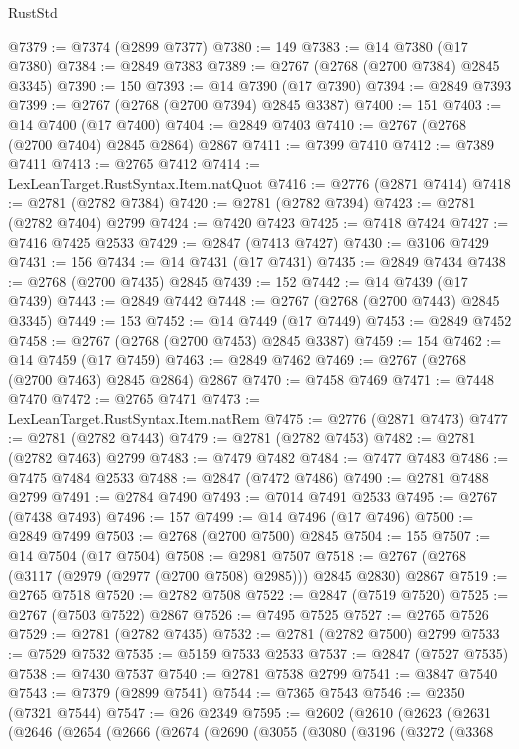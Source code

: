 \begin{lexlean}{RustStd}
\begin{coremodule}
@7379 := @7374 (@2899 @7377)
@7380 := 149
@7383 := @14 @7380 (@17 @7380)
@7384 := @2849 @7383
@7389 := @2767 (@2768 (@2700 @7384) @2845 @3345)
@7390 := 150
@7393 := @14 @7390 (@17 @7390)
@7394 := @2849 @7393
@7399 := @2767 (@2768 (@2700 @7394) @2845 @3387)
@7400 := 151
@7403 := @14 @7400 (@17 @7400)
@7404 := @2849 @7403
@7410 := @2767 (@2768 (@2700 @7404) @2845 @2864) @2867
@7411 := @7399 @7410
@7412 := @7389 @7411
@7413 := @2765 @7412
@7414 := LexLeanTarget.RustSyntax.Item.natQuot
@7416 := @2776 (@2871 @7414)
@7418 := @2781 (@2782 @7384)
@7420 := @2781 (@2782 @7394)
@7423 := @2781 (@2782 @7404) @2799
@7424 := @7420 @7423
@7425 := @7418 @7424
@7427 := @7416 @7425 @2533
@7429 := @2847 (@7413 @7427)
@7430 := @3106 @7429
@7431 := 156
@7434 := @14 @7431 (@17 @7431)
@7435 := @2849 @7434
@7438 := @2768 (@2700 @7435) @2845
@7439 := 152
@7442 := @14 @7439 (@17 @7439)
@7443 := @2849 @7442
@7448 := @2767 (@2768 (@2700 @7443) @2845 @3345)
@7449 := 153
@7452 := @14 @7449 (@17 @7449)
@7453 := @2849 @7452
@7458 := @2767 (@2768 (@2700 @7453) @2845 @3387)
@7459 := 154
@7462 := @14 @7459 (@17 @7459)
@7463 := @2849 @7462
@7469 := @2767 (@2768 (@2700 @7463) @2845 @2864) @2867
@7470 := @7458 @7469
@7471 := @7448 @7470
@7472 := @2765 @7471
@7473 := LexLeanTarget.RustSyntax.Item.natRem
@7475 := @2776 (@2871 @7473)
@7477 := @2781 (@2782 @7443)
@7479 := @2781 (@2782 @7453)
@7482 := @2781 (@2782 @7463) @2799
@7483 := @7479 @7482
@7484 := @7477 @7483
@7486 := @7475 @7484 @2533
@7488 := @2847 (@7472 @7486)
@7490 := @2781 @7488 @2799
@7491 := @2784 @7490
@7493 := @7014 @7491 @2533
@7495 := @2767 (@7438 @7493)
@7496 := 157
@7499 := @14 @7496 (@17 @7496)
@7500 := @2849 @7499
@7503 := @2768 (@2700 @7500) @2845
@7504 := 155
@7507 := @14 @7504 (@17 @7504)
@7508 := @2981 @7507
@7518 := @2767 (@2768 (@3117 (@2979 (@2977 (@2700 @7508) @2985))) @2845 @2830) @2867
@7519 := @2765 @7518
@7520 := @2782 @7508
@7522 := @2847 (@7519 @7520)
@7525 := @2767 (@7503 @7522) @2867
@7526 := @7495 @7525
@7527 := @2765 @7526
@7529 := @2781 (@2782 @7435)
@7532 := @2781 (@2782 @7500) @2799
@7533 := @7529 @7532
@7535 := @5159 @7533 @2533
@7537 := @2847 (@7527 @7535)
@7538 := @7430 @7537
@7540 := @2781 @7538 @2799
@7541 := @3847 @7540
@7543 := @7379 (@2899 @7541)
@7544 := @7365 @7543
@7546 := @2350 (@7321 @7544)
@7547 := @26 @2349
@7595 := @2602
    (@2610
      (@2623
        (@2631
          (@2646
            (@2654
              (@2666
                (@2674
                  (@2690
                    (@3055
                      (@3080
                        (@3196
                          (@3272
                            (@3368

\end{coremodule}
\end{lexlean}
